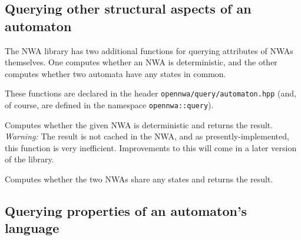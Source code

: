




\subsection{Querying other structural aspects of an automaton}
\label{Se:query-automaton}

The NWA library has two additional functions for querying attributes
of NWAs themselves. One computes whether an NWA is deterministic, and
the other computes whether two automata have any states in common.

These functions are declared in the header
\texttt{opennwa/query/automaton.hpp} (and, of course, are defined in the
namespace \texttt{opennwa::query}).

\begin{functionlist}
    Computes whether the given NWA is deterministic and returns the
    result. \textit{Warning:} The result is not cached in the NWA, and
    as presently-implemented, this function is very
    inefficient. Improvements to this will come in a later version of
    the library.

    Computes whether the two NWAs share any states and returns the
    result.
\end{functionlist}


\subsection{Querying properties of an automaton's language}
\label{Se:query-language}

